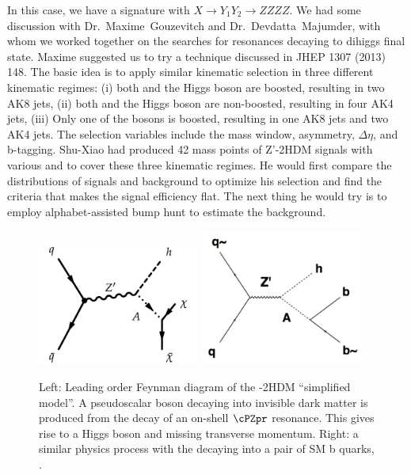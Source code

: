 In this case, we have a signature with $X\rightarrow Y_1 Y_2\rightarrow ZZZZ$. We had some discussion with Dr.~Maxime~Gouzevitch and 
Dr.~Devdatta~Majumder, with whom we worked together on the searches for resonances decaying to dihiggs final state. Maxime suggested 
us to try a technique discussed in JHEP 1307 (2013) 148. The basic idea is to apply similar kinematic selection in three different 
kinematic regimes: (i) both \Az and the Higgs boson are boosted, resulting in two AK8 jets, (ii) both \Az and the Higgs boson are 
non-boosted, resulting in four AK4 jets, (iii) Only one of the bosons is boosted, resulting in one AK8 jets and two AK4 jets.
The selection variables include the mass window, \pt asymmetry, $\Delta \eta$, and b-tagging. Shu-Xiao had produced 42 mass points 
of Z'-2HDM signals with various \maz and \mzp to cover these three kinematic regimes. He would first compare the distributions of 
signals and background to optimize his selection and find the criteria that makes the signal efficiency flat. The next thing he would 
try is to employ alphabet-assisted bump hunt to estimate the background.

\begin{figure}[htbp]
   \centering
   \includegraphics[width=0.475\textwidth]{Figure_001.pdf}
   \includegraphics[width=0.475\textwidth]{Figure_001_modified.pdf}
   \caption{Left: Leading order Feynman diagram of the \cPZpr-2HDM ``simplified model''. A pseudoscalar boson \Az decaying into 
invisible dark matter is produced from the decay of an on-shell $\cPZpr$ resonance. This gives rise to a Higgs boson and missing transverse momentum. Right: a similar physics process with the \Az decaying into a pair of SM b quarks, \cPqb\cPaqb.}
   \label{fig:transformation}
\end{figure}


